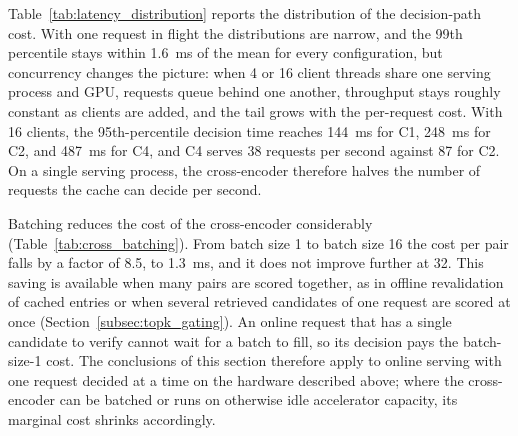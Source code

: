\documentclass[authoryear,preprint,review,12pt]{elsarticle}
\begin{document}
Table~\ref{tab:latency_distribution} reports the distribution of the decision-path cost. With one request in flight the distributions are narrow, and the 99th percentile stays within 1.6~ms of the mean for every configuration, but concurrency changes the picture: when 4 or 16 client threads share one serving process and GPU, requests queue behind one another, throughput stays roughly constant as clients are added, and the tail grows with the per-request cost. With 16 clients, the 95th-percentile decision time reaches 144~ms for C1, 248~ms for C2, and 487~ms for C4, and C4 serves 38 requests per second against 87 for C2. On a single serving process, the cross-encoder therefore halves the number of requests the cache can decide per second.

\begin{table}[htbp]
\centering
\caption{Distribution of decision-path cost for single requests (batch size 1, 300 queries) and under concurrent client threads sharing one serving process and GPU. Throughput is in requests per second.}
\label{tab:latency_distribution}
\end{table}

Batching reduces the cost of the cross-encoder considerably (Table~\ref{tab:cross_batching}). From batch size 1 to batch size 16 the cost per pair falls by a factor of 8.5, to 1.3~ms, and it does not improve further at 32. This saving is available when many pairs are scored together, as in offline revalidation of cached entries or when several retrieved candidates of one request are scored at once (Section~\ref{subsec:topk_gating}). An online request that has a single candidate to verify cannot wait for a batch to fill, so its decision pays the batch-size-1 cost. The conclusions of this section therefore apply to online serving with one request decided at a time on the hardware described above; where the cross-encoder can be batched or runs on otherwise idle accelerator capacity, its marginal cost shrinks accordingly.
\end{document}
